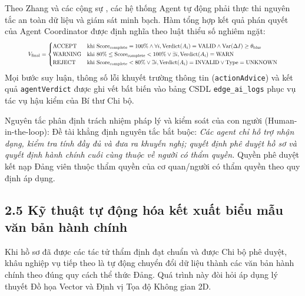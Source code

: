 \documentclass[12pt,a4paper]{report}
\begin{document}
Theo Zhang và các cộng sự \cite{zhang2025llm}, các hệ thống Agent tự động phải thực thi nguyên tắc an toàn dữ liệu và giám sát minh bạch. Hàm tổng hợp kết quả phán quyết của Agent Coordinator được định nghĩa theo luật thiểu số nghiêm ngặt:
\begin{equation}
  \resizebox{0.88\linewidth}{!}{$\displaystyle
      V_{\text{final}} = \begin{cases}
        \text{ACCEPT}  & \text{khi } \text{Score}_{\text{complete}} = 100\% \land \forall i, \text{Verdict}(A_i) = \text{VALID} \land \text{Var}(\Delta I) \ge \theta_{\text{blur}} \\
        \text{WARNING} & \text{khi } 80\% \le \text{Score}_{\text{complete}} < 100\% \lor \exists i, \text{Verdict}(A_i) = \text{WARN}                                              \\
        \text{REJECT}  & \text{khi } \text{Score}_{\text{complete}} < 80\% \lor \exists i, \text{Verdict}(A_i) = \text{INVALID} \lor \text{Type} = \text{UNKNOWN}
      \end{cases}
    $}
\end{equation}
Mọi bước suy luận, thông số lỗi khuyết trường thông tin (\texttt{actionAdvice}) và kết quả \texttt{agentVerdict} được ghi vết bất biến vào bảng CSDL \texttt{edge\_ai\_logs} phục vụ tác vụ hậu kiểm của Bí thư Chi bộ.

Nguyên tắc phân định trách nhiệm pháp lý và kiểm soát của con người (Human-in-the-loop): Đề tài khẳng định nguyên tắc bắt buộc: \textit{Các agent chỉ hỗ trợ nhận dạng, kiểm tra tính đầy đủ và đưa ra khuyến nghị; quyết định phê duyệt hồ sơ và quyết định hành chính cuối cùng thuộc về người có thẩm quyền.} Quyền phê duyệt kết nạp Đảng viên thuộc thẩm quyền của cơ quan/người có thẩm quyền theo quy định áp dụng.

\subsection*{2.5 Kỹ thuật tự động hóa kết xuất biểu mẫu văn bản hành chính}
Khi hồ sơ đã được các tác tử thẩm định đạt chuẩn và được Chi bộ phê duyệt, khâu nghiệp vụ tiếp theo là tự động chuyển đổi dữ liệu thành các văn bản hành chính theo đúng quy cách thể thức Đảng. Quá trình này đòi hỏi áp dụng lý thuyết Đồ họa Vector và Định vị Tọa độ Không gian 2D.
\end{document}
